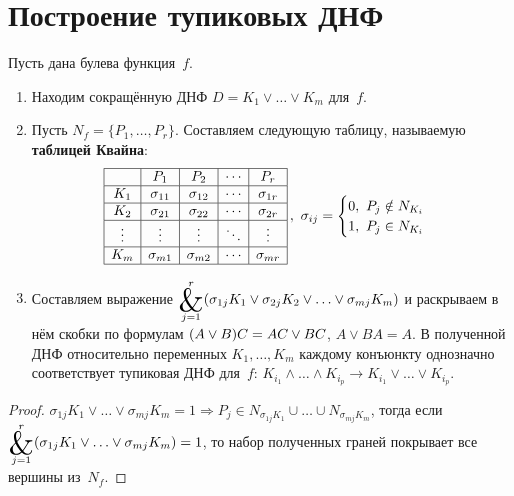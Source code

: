 \section{Построение тупиковых ДНФ}
Пусть дана булева функция~$f$.
\begin{enumerate}
	\item Находим сокращённую ДНФ $D = K_1 \lor \ldots \lor K_m$ для~$f$.
	
	\item Пусть $N_f = \{ P_1, \ldots, P_r \}$.
	Составляем следующую таблицу, называемую \textbf{таблицей Квайна}:
	\begin{equation*}
	\begin{array}{|c|c|c|c|c|}
	\hline
	    & P_1 & P_2 & \cdots & P_r \\
    \hline
	K_1 & \sigma_{11} & \sigma_{12} & \cdots & \sigma_{1r} \\
	\hline
	K_2 & \sigma_{21} & \sigma_{22} & \cdots & \sigma_{2r} \\
	\hline
	\vdots & \vdots & \vdots & \ddots & \vdots \\
	\hline
	K_m & \sigma_{m1} & \sigma_{m2} & \cdots & \sigma_{mr} \\
	\hline
	\end{array}\,, \
	\sigma_{ij} =
	\begin{cases}
	0, \ P_j \notin N_{K_i} \\
	1, \ P_j \in N_{K_i}
	\end{cases}
	\end{equation*}
	
	\item Составляем выражение $\displaystyle \bigand_{j=1}^r (\sigma_{1j} K_1 \lor \sigma_{2j} K_2 \lor \ldots \lor \sigma_{mj} K_m)$ и раскрываем в нём скобки по формулам $(A \lor B)C \opbr= AC \lor BC$, $A \lor BA = A$.
	В полученной ДНФ относительно переменных $K_1, \ldots, K_m$ каждому конъюнкту однозначно соответствует тупиковая ДНФ для~$f$: $K_{i_1} \land \ldots \land K_{i_p} \to K_{i_1} \lor \ldots \lor K_{i_p}$.
\end{enumerate}
\begin{proof}
$\sigma_{1j} K_1 \lor \ldots \lor \sigma_{mj} K_m = 1 \Rightarrow
P_j \in N_{\sigma_{1j} K_1} \cup \ldots \cup N_{\sigma_{mj} K_m}$, тогда если
$\displaystyle \bigand_{j=1}^r (\sigma_{1j} K_1 \lor \ldots \lor \sigma_{mj} K_m) \opbr= 1$, то набор полученных граней покрывает все вершины из~$N_f$.
\end{proof}